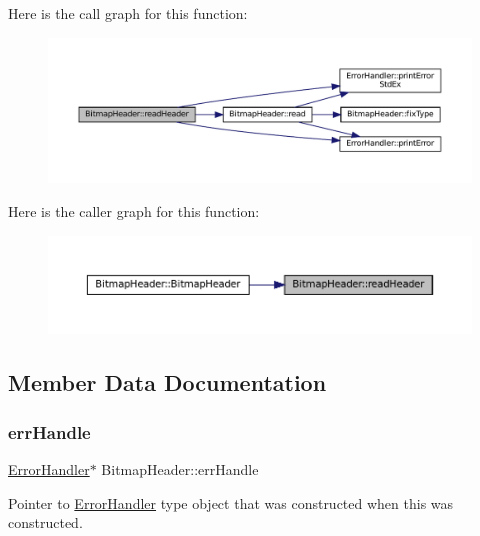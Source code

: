 Here is the call graph for this function\+:\nopagebreak
\begin{figure}[H]
\begin{center}
\leavevmode
\includegraphics[width=350pt]{classBitmapHeader_a66adc11592dc1d18edbd46bade1db242_cgraph}
\end{center}
\end{figure}
Here is the caller graph for this function\+:\nopagebreak
\begin{figure}[H]
\begin{center}
\leavevmode
\includegraphics[width=350pt]{classBitmapHeader_a66adc11592dc1d18edbd46bade1db242_icgraph}
\end{center}
\end{figure}


\subsection{Member Data Documentation}
\mbox{\label{classBitmapHeader_ab06f141245d592302dabe48571d12e32}} 
\subsubsection{\texorpdfstring{errHandle}{errHandle}}
{\footnotesize\ttfamily \mbox{\hyperlink{classErrorHandler}{Error\+Handler}}$\ast$ Bitmap\+Header\+::err\+Handle\hspace{0.3cm}{\ttfamily [private]}}

Pointer to \mbox{\hyperlink{classErrorHandler}{Error\+Handler}} type object that was constructed when this was constructed. 

